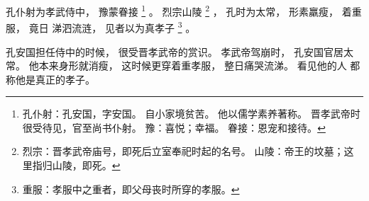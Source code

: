 
\switchcolumn*[\section{}]

孔仆射为孝武侍中，
豫蒙眷接%
\footnote{%
    孔仆射：孔安国，字安国。
            自小家境贫苦。
            他以儒学素养著称。
            晋孝武帝时很受待见，官至尚书仆射。
    豫：喜悦；幸福。
    眷接：恩宠和接待。
}%
。
烈宗山陵%
\footnote{%
    烈宗：晋孝武帝庙号，即死后立室奉祀时起的名号。
    山陵：帝王的坟墓；这里指归山陵，即死。
}%
，
孔时为太常，
形素羸瘦，
着重服，
竟日
涕泗流涟，
见者以为真孝子%
\footnote{%
    重服：孝服中之重者，即父母丧时所穿的孝服。
}%
。

\switchcolumn

孔安国担任侍中的时候，
很受晋孝武帝的赏识。
孝武帝驾崩时，
孔安国官居太常。
他本来身形就消瘦，
这时候更穿着重孝服，
整日痛哭流涕。
看见他的人
都称他是真正的孝子。
